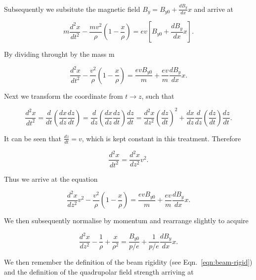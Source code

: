 Subsequently we subsitute the magnetic field $B_{y} = B_{y0} + \frac{dB_{y}}{dx} x$ and arrive at

\begin{equation}
 m\frac{d^{2}x}{dt^{2}}  - \frac{mv^{2}}{\rho}\left( 1 - \frac{x}{\rho} \right) = e v \left[ B_{y0} + \frac{dB_{y}}{dx} x \right].
\end{equation}

By dividing throught by the mass m

\begin{equation}
 \frac{d^{2}x}{dt^{2}}  - \frac{v^{2}}{\rho}\left( 1 - \frac{x}{\rho} \right) = \frac{e v B_{y0}}{m} + \frac{ev}{m}\frac{dB_{y}}{dx} x.
\end{equation}

Next we transform the coordinate from $t \rightarrow z$, such that 

\begin{equation}
\frac{d^{2}x}{dt^{2}} = \frac{d}{dt} \left( \frac{dx}{dz} \frac{dz}{dt} \right) = \frac{d}{dz} \left( \frac{dx}{dz} \frac{dz}{dt} \right) \frac{dz}{dt} = \frac{d^{2}x}{dz^{2}}\left( \frac{dz}{dt} \right)^{2} + \frac{dx}{dz} \frac{d}{dz} \left( \frac{dz}{dt} \right) \frac{dz}{dt}.
\end{equation}

It can be seen that $\frac{dz}{dt} = v$, which is kept constant in this treatment. Therefore

\begin{equation}
\frac{d^{2}x}{dt^{2}} = \frac{d^{2}x}{dz^{2}} v^{2}.
\end{equation}

Thus we arrive at the equation

\begin{equation}
\frac{d^{2}x}{dz^{2}} v^{2} - \frac{v^{2}}{\rho}\left( 1 - \frac{x}{\rho} \right) = \frac{e v B_{y0}}{m} + \frac{ev}{m}\frac{dB_{y}}{dx} x.
\end{equation}

We then subsequently normalise by momentum and rearrange slightly to acquire

\begin{equation}
\frac{d^{2}x}{dz^{2}} - \frac{1}{\rho} + \frac{x}{\rho^{2}}  = \frac{ B_{y0}}{p/e} + \frac{1}{p/e}\frac{dB_{y}}{dx} x.
\end{equation}

We then remember the definition of the beam rigidity (see Eqn.~\ref{eqn:beam-rigid}) and the definition of the quadrupolar field strength arriving at

